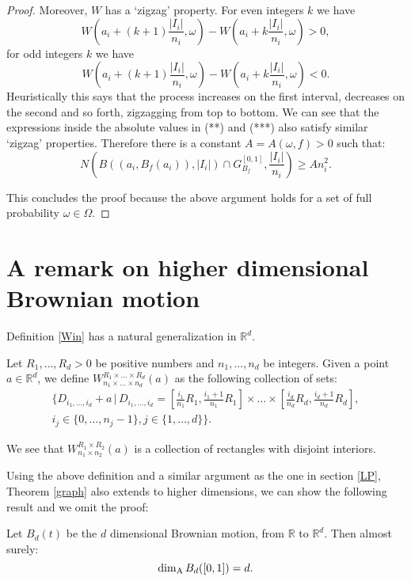 \begin{proof}
	Moreover, $W$ has a `zigzag' property. For even integers $k$ we have
	\[
	W\left(a_i+(k+1)\frac{|I_i|}{n_i},\omega\right)-W\left(a_i+k\frac{|I_i|}{n_i},\omega\right)>0,
	\] 
	for odd integers $k$ we have
	\[
	W\left(a_i+(k+1)\frac{|I_i|}{n_i},\omega\right)-W\left(a_i+k\frac{|I_i|}{n_i},\omega\right)<0.
	\]  
	Heuristically this says that the process increases on the first interval, decreases on the second and so forth, zigzagging from top to bottom. We can see that the expressions inside the absolute values in (**) and (***) also satisfy similar `zigzag' properties. Therefore there is a constant $A=A(\omega,f)>0$ such that:
	\[
	N\left(B\left(\left(a_i,B_f(a_i)\right),|I_i|\right)\cap G_{B_f}^{[0,1]},\frac{|I_i|}{n_i}\right)\geq A n_i^2.
	\] 
	
	This concludes the proof because the above argument holds for a set of full probability $\omega\in\Omega$.
\end{proof}



\section{A remark on higher dimensional Brownian motion}

Definition \ref{Win} has a natural generalization in $\mathbb{R}^d$.
\begin{defn}\label{Win2}
	Let $R_1,\dots,R_d>0$ be positive numbers and $n_1,\dots, n_d$ be integers. Given a point $a\in\mathbb{R}^d$, we define $W_{n_1\times\dots\times n_d}^{R_1\times\dots\times R_d}(a)$ as the following collection of sets:
	\begin{eqnarray*}
		\Bigg\{D_{i_1,\dots,i_d}+a \, \vert \, D_{i_1,\dots,i_d}=\left[\frac{i_1}{n_1}R_1,\frac{i_1+1}{n_1}R_1\right]\times\dots\times \left[\frac{i_d}{n_d}R_d,\frac{i_d+1}{n_d}R_d\right],\\ i_j\in\{0,\dots,n_j-1\}, j\in\{1,\dots,d\}\Bigg\}.
	\end{eqnarray*}
	
	We see that $W_{n_1\times n_2}^{R_1\times R_2}(a)$ is a collection of rectangles with disjoint interiors.
\end{defn}

Using the above definition and a similar argument as the one in section \ref{LP},  Theorem \ref{graph} also extends to higher dimensions, we can show the following result and we omit the proof:

\begin{thm}
	Let $B_d(t)$ be the $d$ dimensional Brownian motion, from $\mathbb{R}$ to $\mathbb{R}^d$. Then almost surely:
	\[
	\dim_{\mathrm{A}} B_d([0,1])=d.
	\]
\end{thm}

